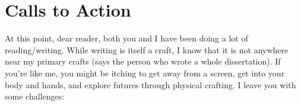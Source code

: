 









\pagebreak
\section{Calls to Action}

At this point, dear reader, both you and I have been doing a lot of reading/writing. While writing is itself a craft, I know that it is not anywhere near my primary crafts (says the person who wrote a whole dissertation). If you're like me, you might be itching to get away from a screen, get into your body and hands, and explore futures through physical crafting. I leave you with some challenges:

